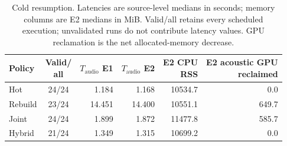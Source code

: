 \begin{table}[tbp]
    \centering
    \small
    \setlength{\tabcolsep}{4pt}
    \caption{Cold resumption. Latencies are source-level medians in seconds; memory columns are E2 medians in MiB. Valid/all retains every scheduled execution; unvalidated runs do not contribute latency values. GPU reclamation is the net allocated-memory decrease.}
    \label{tab:main_recovery}
    \begin{tabular}{@{}lcrrrr@{}}
        \toprule
        Policy & \shortstack{Valid/\\all} & \shortstack{$T_{\mathrm{audio}}$\\E1} & \shortstack{$T_{\mathrm{audio}}$\\E2} & \shortstack{E2 CPU\\RSS} & \shortstack{E2 acoustic GPU\\reclaimed} \\
        \midrule
        Hot & 24/24 & 1.184 & 1.168 & 10534.7 & 0.0 \\
        Rebuild & 23/24 & 14.451 & 14.400 & 10551.1 & 649.7 \\
        Joint & 24/24 & 1.899 & 1.872 & 11477.8 & 585.7 \\
        Hybrid & 21/24 & 1.349 & 1.315 & 10699.2 & 0.0 \\
        \bottomrule
    \end{tabular}
\end{table}
